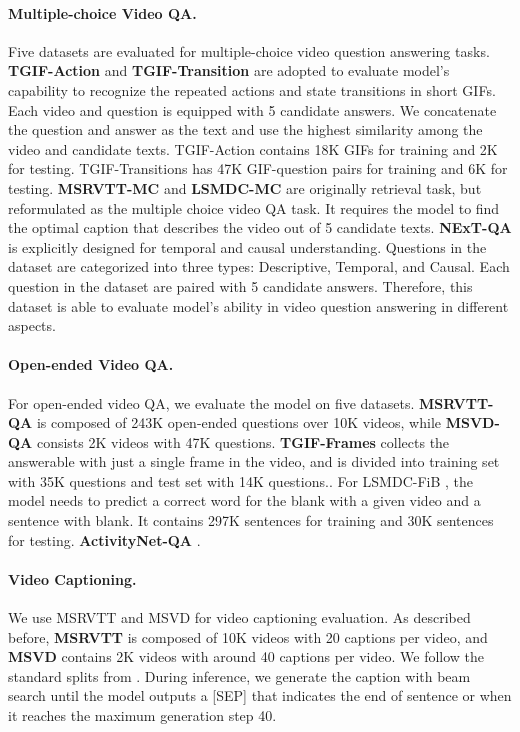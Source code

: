 \documentclass[10pt,twocolumn,letterpaper]{article}
\begin{document}
\paragraph{Multiple-choice Video QA.} Five datasets are evaluated for multiple-choice video question answering tasks.
\textbf{TGIF-Action} and \textbf{TGIF-Transition} \cite{jang2017tgif} are adopted to evaluate model's capability to recognize the repeated actions and state transitions in short GIFs. Each video and question is equipped with 5 candidate answers. We concatenate the question and answer as the text and use the highest similarity among the video and candidate texts. TGIF-Action contains 18K GIFs for training and 2K for testing. TGIF-Transitions has 47K GIF-question pairs for training and 6K for testing.
\textbf{MSRVTT-MC} \cite{yu2018msrvttmc} and \textbf{LSMDC-MC} \cite{torabi2016lsmdcmc} are originally retrieval task, but reformulated as the multiple choice video QA task. It requires the model to find the optimal caption that describes the video out of 5 candidate texts. 
\textbf{NExT-QA} \cite{xiao2021nextqa} is explicitly designed for temporal
and causal understanding. Questions in the dataset are categorized into three types: Descriptive, Temporal, and Causal. Each question in the dataset are paired with 5 candidate answers. Therefore, this dataset is able to evaluate model's ability in video question answering in different aspects.

\paragraph{Open-ended Video QA.} For open-ended video QA, we evaluate the model on five datasets. 
\textbf{MSRVTT-QA} is composed of 243K open-ended questions over 10K videos, while \textbf{MSVD-QA} \cite{xu2017msrvttqa} consists 2K videos with 47K questions. \textbf{TGIF-Frames} \cite{jang2017tgif} collects the answerable with just a single frame in the video, and is divided into training set with 35K questions and test set with 14K questions.. For LSMDC-FiB \cite{maharaj2017lsmdcfib}, the model needs to predict a correct word for the blank with a given video and a sentence with blank. It contains 297K sentences for training and 30K sentences for testing. \textbf{ActivityNet-QA} \cite{yu2019activitynetqa} .

\paragraph{Video Captioning.} We use MSRVTT \cite{xu2016msrvtt} and MSVD \cite{chen2011msvd} for video captioning evaluation. As described before, \textbf{MSRVTT} is composed of 10K videos with 20 captions per video, and \textbf{MSVD} contains 2K videos with around 40 captions per video. We follow the standard splits from \cite{lin2022swinbert, li2022lavender}. During inference, we generate the caption with beam search until the model outputs a [SEP] that indicates the end of sentence or when it reaches the maximum generation step 40.
\end{document}
